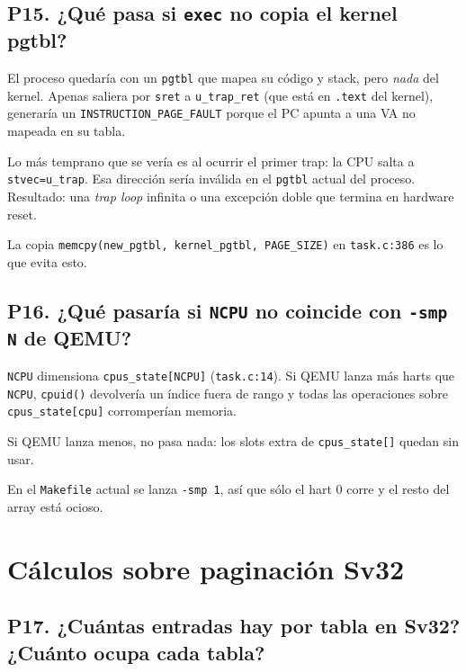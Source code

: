 \documentclass[11pt,a4paper]{article}
\begin{document}
\subsection*{P15. ¿Qué pasa si \texttt{exec} no copia el kernel pgtbl?}

\begin{respuesta}
El proceso quedaría con un \texttt{pgtbl} que mapea su código y
stack, pero \emph{nada} del kernel. Apenas saliera por
\texttt{sret} a \texttt{u\_trap\_ret} (que está en \texttt{.text}
del kernel), generaría un \texttt{INSTRUCTION\_PAGE\_FAULT} porque
el PC apunta a una VA no mapeada en su tabla.

Lo más temprano que se vería es al ocurrir el primer trap: la CPU
salta a \texttt{stvec=u\_trap}. Esa dirección sería inválida en el
\texttt{pgtbl} actual del proceso. Result\-ado: una \emph{trap
loop} infinita o una excepción doble que termina en hardware reset.

La copia \texttt{memcpy(new\_pgtbl, kernel\_pgtbl, PAGE\_SIZE)} en
\texttt{task.c:386} es lo que evita esto.
\end{respuesta}

\subsection*{P16. ¿Qué pasaría si \texttt{NCPU} no coincide con \texttt{-smp N} de QEMU?}

\begin{respuesta}
\texttt{NCPU} dimensiona \texttt{cpus\_state[NCPU]}
(\texttt{task.c:14}). Si QEMU lanza más harts que \texttt{NCPU},
\texttt{cpuid()} devolvería un índice fuera de rango y todas las
operaciones sobre \texttt{cpus\_state[cpu]} corromperían memoria.

Si QEMU lanza menos, no pasa nada: los slots extra de
\texttt{cpus\_state[]} quedan sin usar.

En el \texttt{Makefile} actual se lanza \texttt{-smp 1}, así que
sólo el hart 0 corre y el resto del array está ocioso.
\end{respuesta}

\section{Cálculos sobre paginación Sv32}

\subsection*{P17. ¿Cuántas entradas hay por tabla en Sv32? ¿Cuánto ocupa cada tabla?}
\end{document}
